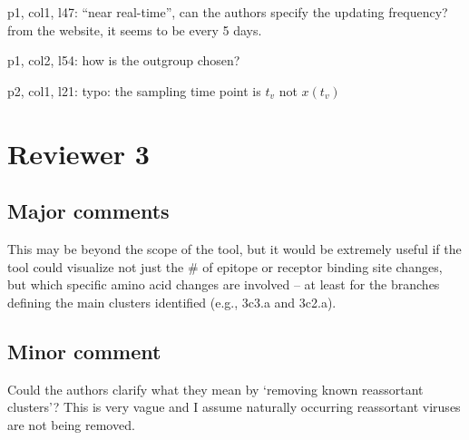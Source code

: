 \documentclass[11pt,oneside,letterpaper]{article}
\begin{document}
p1, col1, l47: ``near real-time'', can the authors specify the updating frequency? from the website, it seems to be every 5 days.

p1, col2, l54: how is the outgroup chosen?

p2, col1, l21: typo: the sampling time point is $t_v$ not $x(t_v)$

\section*{Reviewer 3}

\subsection*{Major comments}

This may be beyond the scope of the tool, but it would be extremely useful if the tool could visualize not just the \# of epitope or receptor binding site changes, but which specific amino acid changes are involved -- at least for the branches defining the main clusters identified (e.g., 3c3.a and 3c2.a).

\subsection*{Minor comment}

Could the authors clarify what they mean by `removing known reassortant clusters'?  This is very vague and I assume naturally occurring reassortant viruses are not being removed.
\end{document}
